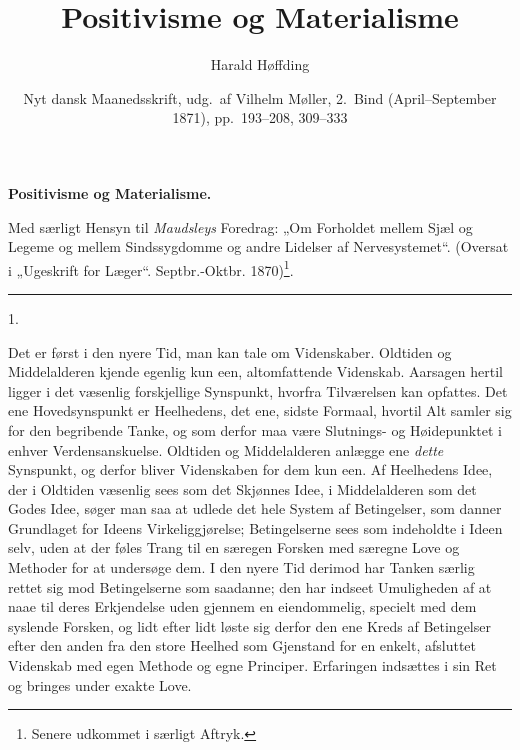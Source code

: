 \documentclass[12pt,a4paper,openany]{book}
\title{\textbf{Positivisme og Materialisme}}
\author{Harald Høffding}
\date{Nyt dansk Maanedsskrift, udg.\ af Vilhelm Møller,
  2.\ Bind (April--September 1871), pp.~193--208, 309--333}
\newcommand{\secnum}[1]{\par\begin{center}#1\end{center}\par\nobreak}
\newcommand{\opage}[1]{\marginnote{\footnotesize\textit{[#1]}}}
\begin{document}
\maketitle
\thispagestyle{empty}
\clearpage

\opage{193}\begin{center}\textbf{\large Positivisme og Materialisme.}\end{center}

{\small Med særligt Hensyn til \emph{Maudsleys} Foredrag: „Om Forholdet mellem Sjæl og Legeme og mellem Sindssygdomme og andre Lidelser af Nervesystemet“. (Oversat i „Ugeskrift for Læger“. Septbr.-Oktbr. 1870)\footnote{Senere udkommet i særligt Aftryk.}.\par}

\begin{center}\rule{1.8cm}{0.4pt}\end{center}

\secnum{1.}

Det er først i den nyere Tid, man kan tale om Videnskaber.
Oldtiden og Middelalderen kjende egenlig kun een,
altomfattende Videnskab. Aarsagen hertil ligger i det væsenlig
forskjellige Synspunkt, hvorfra Tilværelsen kan opfattes.
Det ene Hovedsynspunkt er Heelhedens, det ene, sidste Formaal,
hvortil Alt samler sig for den begribende Tanke, og
som derfor maa være Slutnings- og Høidepunktet i enhver
Verdensanskuelse. Oldtiden og Middelalderen anlægge ene
\emph{dette} Synspunkt, og derfor bliver Videnskaben for dem kun
een. Af Heelhedens Idee, der i Oldtiden væsenlig sees som
det Skjønnes Idee, i Middelalderen som det Godes Idee,
søger man saa at udlede det hele System af Betingelser, som
danner Grundlaget for Ideens Virkeliggjørelse; Betingelserne
sees som indeholdte i Ideen selv, uden at der føles Trang til
en særegen Forsken med særegne Love og Methoder for at
undersøge dem. I den nyere Tid derimod har Tanken
særlig rettet sig mod Betingelserne som saadanne; den har
\opage{194}indseet Umuligheden af at naae til deres Erkjendelse uden
gjennem en eiendommelig, specielt med dem syslende Forsken,
og lidt efter lidt løste sig derfor den ene Kreds af Betingelser
efter den anden fra den store Heelhed som Gjenstand for en
enkelt, afsluttet Videnskab med egen Methode og egne Principer.
Erfaringen indsættes i sin Ret og bringes under
exakte Love.
\end{document}
